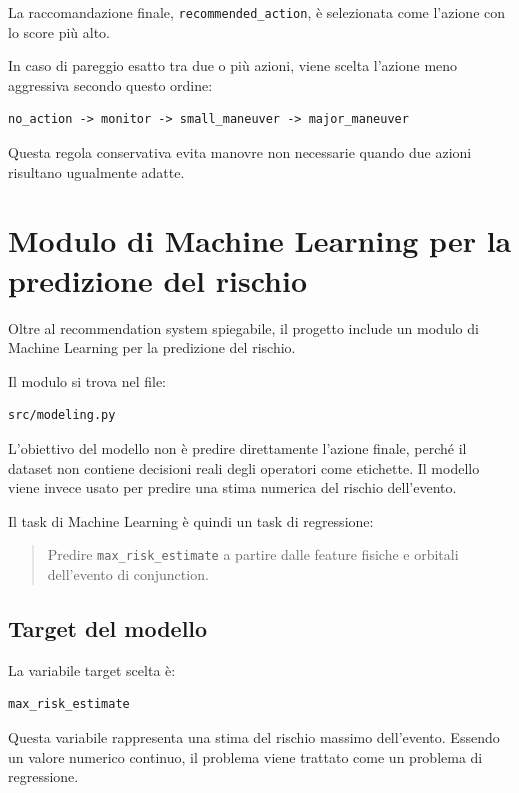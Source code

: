 \documentclass[12pt,a4paper]{article}
\begin{document}
La raccomandazione finale, \texttt{recommended\_action}, è selezionata come l'azione con lo score più alto.

In caso di pareggio esatto tra due o più azioni, viene scelta l'azione meno aggressiva secondo questo ordine:

\begin{verbatim}
no_action -> monitor -> small_maneuver -> major_maneuver
\end{verbatim}

Questa regola conservativa evita manovre non necessarie quando due azioni risultano ugualmente adatte.

\section{Modulo di Machine Learning per la predizione del rischio}

Oltre al recommendation system spiegabile, il progetto include un modulo di Machine Learning per la predizione del rischio.

Il modulo si trova nel file:

\begin{verbatim}
src/modeling.py
\end{verbatim}

L'obiettivo del modello non è predire direttamente l'azione finale, perché il dataset non contiene decisioni reali degli operatori come etichette. Il modello viene invece usato per predire una stima numerica del rischio dell'evento.

Il task di Machine Learning è quindi un task di regressione:

\begin{quote}
Predire \texttt{max\_risk\_estimate} a partire dalle feature fisiche e orbitali dell'evento di conjunction.
\end{quote}

\subsection{Target del modello}

La variabile target scelta è:

\begin{verbatim}
max_risk_estimate
\end{verbatim}

Questa variabile rappresenta una stima del rischio massimo dell'evento. Essendo un valore numerico continuo, il problema viene trattato come un problema di regressione.
\end{document}

